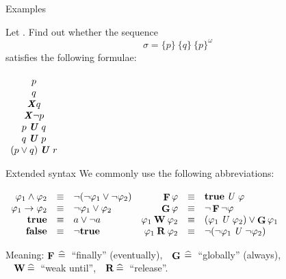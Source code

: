 
\begin{frame}{Examples}

Let . Find out whether the sequence
    $$\sigma=\{p\}\ \{q\}\ \{p\}^\omega$$
 satisfies the following formulae:

\begin{center}\(\begin{array}[t]{c}
p \\
q \\
\hl{\X} q \\
\hl{\X} \neg p  \\
p \hl{\U} q  \\
q \hl{\U} p  \\
(p\lor q) \hl{\U} r 
\end{array}\)\end{center}

\end{frame}


\begin{frame}{Extended syntax}
We commonly use the following abbreviations:

\bigskip\small
  \(\begin{array}[t]{rcl@{\quad}rcl}
      \phi_1\land\phi_2 & \equiv & \neg(\neg\phi_1\lor\neg\phi_2) &
      \F\phi            & \equiv & {\bf true}\U\phi\\
      \phi_1\to\phi_2   & \equiv & \neg\phi_1\lor\phi_2 &
      \G\phi            & \equiv & \neg\F\neg\phi\\
      {\bf true}        & \equiv & a\lor\neg a &
      \phi_1\W\phi_2    & \equiv & (\phi_1\U\phi_2)\lor\G\phi_1\\
      {\bf false}       & \equiv & \neg{\bf true} &
      \phi_1\R\phi_2    & \equiv & \neg(\neg\phi_1\U\neg\phi_2)\\
    \end{array}\)

\bigskip
Meaning:
$\mathop{\bf F}\nolimits\>\widehat{=}\>$ ``finally'' (eventually),\ \ 
$\mathop{\bf G}\nolimits\>\widehat{=}\>$ ``globally'' (always),\\
\ \phantom{Meaning:}%
$\mathbin{\bf W}\>\widehat{=}\>$ ``weak until'',\ \ 
$\mathbin{\bf R}\>\widehat{=}\>$ ``release''.

\end{frame}


